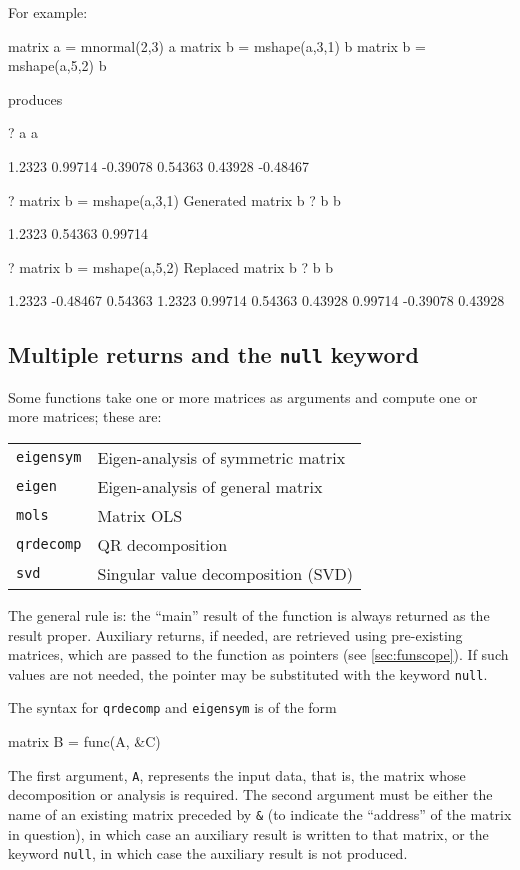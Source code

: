 For example:
\begin{code}
matrix a = mnormal(2,3)
a
matrix b = mshape(a,3,1)
b
matrix b = mshape(a,5,2)
b
\end{code}
produces
\begin{code}
?   a
a

      1.2323      0.99714     -0.39078
     0.54363      0.43928     -0.48467

?   matrix b = mshape(a,3,1)
Generated matrix b
?   b
b

      1.2323
     0.54363
     0.99714

?   matrix b = mshape(a,5,2)
Replaced matrix b
?   b
b

      1.2323     -0.48467
     0.54363       1.2323
     0.99714      0.54363
     0.43928      0.99714
    -0.39078      0.43928
\end{code}

\subsection{Multiple returns and the \texttt{null} keyword}
\label{matrix-multiples}

Some functions take one or more matrices as arguments and compute one
or more matrices; these are:

\begin{center}
\begin{tabular}{ll}
\texttt{eigensym} & Eigen-analysis of symmetric matrix \\
\texttt{eigen}    & Eigen-analysis of general matrix \\
\texttt{mols}     & Matrix OLS \\
\texttt{qrdecomp} & QR decomposition \\
\texttt{svd}      & Singular value decomposition (SVD) 
\end{tabular}
\end{center}

The general rule is: the ``main'' result of the function is always
returned as the result proper. Auxiliary returns, if needed, are
retrieved using pre-existing matrices, which are passed to the
function as pointers (see \ref{sec:funscope}). If such values are not
needed, the pointer may be substituted with the keyword \texttt{null}.

The syntax for \texttt{qrdecomp} and \texttt{eigensym} is of the form
%
\begin{code}
matrix B = func(A, &C)
\end{code}
%
The first argument, \texttt{A}, represents the input data, that is,
the matrix whose decomposition or analysis is required.  The second
argument must be either the name of an existing matrix preceded by
\verb+&+ (to indicate the ``address'' of the matrix in question), in
which case an auxiliary result is written to that matrix, or the
keyword \texttt{null}, in which case the auxiliary result is not
produced.

